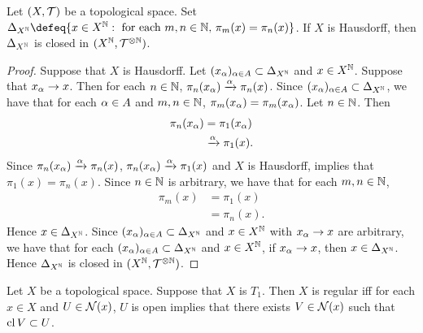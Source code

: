 \documentclass{book}
\begin{document}
	\begin{ex} 
		Let $(X, \mathcal{T})$ be a topological space. Set $\Del_{X^{\N}} \defeq \{x \in X^{\N}: \text{ for each $m,n \in \N$, $\pi_m(x) = \pi_n(x)$}\}$. If $X$ is Hausdorff, then $\Delta_{X^{\mathbb{N}}}$ is closed in $(X^{\mathbb{N}}, \mathcal{T}^{\otimes \mathbb{N}})$.
	\end{ex}

	\begin{proof}
		Suppose that $X$ is Hausdorff. Let $(x_{\alpha})_{\alpha \in A} \subset \Delta_{X^{\mathbb{N}}}$ and $x \in X^{\mathbb{N}}$. Suppose that $x_{\alpha} \rightarrow x$. Then for each $n \in \mathbb{N}$, $\pi_n(x_{\alpha}) \xrightarrow{\alpha} \pi_n(x)$. Since $(x_{\alpha})_{\alpha \in A} \subset \Delta_{X^{\mathbb{N}}}$, we have that for each $\alpha \in A$ and $m,n \in \mathbb{N}$, $\pi_m(x_{\alpha}) = \pi_m(x_{\alpha})$. Let $n \in \mathbb{N}$. Then
		\begin{align*}
			\pi_n(x_{\alpha}) 
			& = \pi_1(x_{\alpha}) \\
			& \xrightarrow{\alpha} \pi_1(x).
		\end{align*}
		Since $\pi_n(x_{\alpha}) \xrightarrow{\alpha} \pi_n(x)$, $\pi_n(x_{\alpha}) \xrightarrow{\alpha} \pi_1(x)$ and $X$ is Hausdorff,  implies that $\pi_1(x) = \pi_n(x)$. Since $n \in \mathbb{N}$ is arbitrary, we have that for each $m,n \in \mathbb{N}$, 
		\begin{align*}
			\pi_m(x)
			& = \pi_1(x) \\
			& = \pi_n(x).
		\end{align*}
		Hence $x \in \Delta_{X^{\mathbb{N}}}$. Since $(x_{\alpha})_{\alpha \in A} \subset \Delta_{X^{\mathbb{N}}}$ and $x \in X^{\mathbb{N}}$ with $x_{\alpha} \rightarrow x$ are arbitrary, we have that for each $(x_{\alpha})_{\alpha \in A} \subset \Delta_{X^{\mathbb{N}}}$ and $x \in X^{\mathbb{N}}$, if $x_{\alpha} \rightarrow x$, then $x \in \Delta_{X^{\mathbb{N}}}$. Hence $\Delta_{X^{\mathbb{N}}}$ is closed in $(X^{\mathbb{N}}, \mathcal{T}^{\otimes \mathbb{N}})$. 
	\end{proof}

	\begin{ex} 
		Let $X$ be a topological space. Suppose that $X$ is $T_1$. Then $X$ is regular iff for each $x \in X$ and $U \in \mathcal{N}(x)$, $U$ is open implies that there exists $V \in \mathcal{N}(x)$ such that $\operatorname{cl} V \subset U$. 
	\end{ex}
\end{document}
